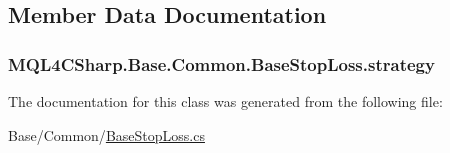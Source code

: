 \subsection{Member Data Documentation}
\subsubsection[{\texorpdfstring{strategy}{strategy}}]{ M\+Q\+L4\+C\+Sharp.\+Base.\+Common.\+Base\+Stop\+Loss.\+strategy}\hypertarget{class_m_q_l4_c_sharp_1_1_base_1_1_common_1_1_base_stop_loss_a8cbd2ea8e6ab4e5af253a32116905162}{}\label{class_m_q_l4_c_sharp_1_1_base_1_1_common_1_1_base_stop_loss_a8cbd2ea8e6ab4e5af253a32116905162}


The documentation for this class was generated from the following file\+:\begin{DoxyCompactItemize}
\item 
Base/\+Common/\hyperlink{_base_stop_loss_8cs}{Base\+Stop\+Loss.\+cs}\end{DoxyCompactItemize}
